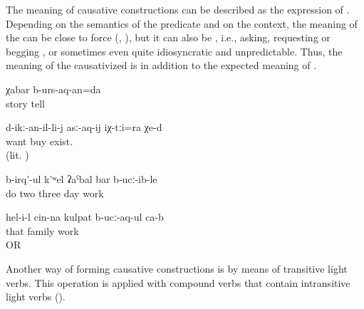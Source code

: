 The meaning of causative constructions can be described as the expression of  \citep{Kulikov2011}. Depending on the semantics of the predicate and on the context, the meaning of the  can be close to force (, ), but it can also be , i.e., asking, requesting or begging , or sometimes even quite idiosyncratic and unpredictable. Thus, the meaning of the causativized    is   in addition to the expected  meaning of .

\begin{exe}
	\ex	\label{ex:‎We will ask for telling the story}
	\gll	χabar	b-urs-aq-an=da\\
		story	tell\\
	\glt	{}

	\ex	\label{ex:‎They are also for those who want to buy them}
	\gll	d-ikː-an-il-li-j	asː-aq-ij	iχ-tːi=ra	χe-d\\
		want	buy  exist.\\
	\glt	{} (lit. )

	\ex	\label{ex:‎‎‎(they were) building, working for three days}
	\gll	b-irq'-ul	k'ʷel	ʡaˁbal	bar	b-ucː-ib-le\\
		do	two	three	day	work\\
	\glt	{}

	\ex	\label{ex:He feeds his family (he sustains his family working)}
	\gll	hel-i-l	cin-na	kulpat	b-ucː-aq-ul ca-b\\
		that		family	work \\
	\glt	{} OR 
\end{exe}

Another way of forming causative constructions is by means of transitive light verbs. This operation is applied with compound verbs that contain intransitive light verbs ().
